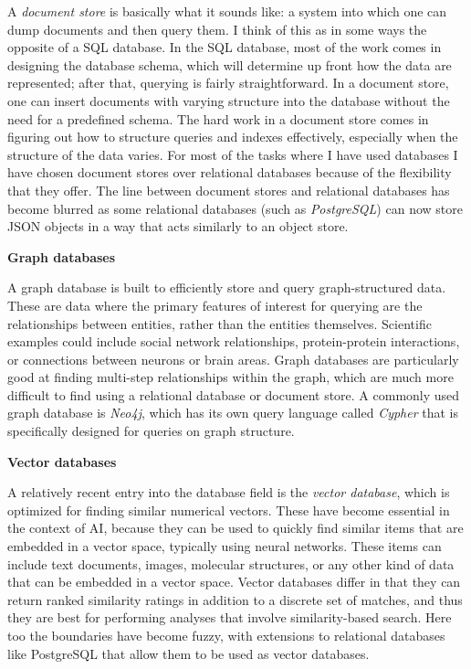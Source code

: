 A \textit{document store} is basically what it sounds like: a system into which one can dump documents and then query them. I think of this as in some ways the opposite of a SQL database.  In the SQL database, most of the work comes in designing the database schema, which will determine up front how the data are represented; after that, querying is fairly straightforward.  In a document store, one can insert documents with varying structure into the database without the need for a predefined schema. The hard work in a document store comes in figuring out how to structure queries and indexes effectively, especially when the structure of the data varies.  For most of the tasks where I have used databases I have chosen document stores over relational databases because of the flexibility that they offer. The line between document stores and relational databases has become blurred as some relational databases (such as \textit{PostgreSQL}) can now store JSON objects in a way that acts similarly to an object store.

\textbf{Graph databases}

A graph database is built to efficiently store and query graph-structured data.  These are data where the primary features of interest for querying are the relationships between entities, rather than the entities themselves. Scientific examples could include social network relationships, protein-protein interactions, or connections between neurons or brain areas.  Graph databases are particularly good at finding multi-step relationships within the graph, which are much more difficult to find using a relational database or document store.  A commonly used graph database is \textit{Neo4j}, which has its own query language called \textit{Cypher} that is specifically designed for queries on graph structure.

\textbf{Vector databases}

A relatively recent entry into the database field is the \textit{vector database}, which is optimized for finding similar numerical vectors.  These have become essential in the context of AI, because they can be used to quickly find similar items that are embedded in a vector space, typically using neural networks.  These items can include text documents, images, molecular structures, or any other kind of data that can be embedded in a vector space.  Vector databases differ in that they can return ranked similarity ratings in addition to a discrete set of matches, and thus they are best for performing analyses that involve similarity-based search.  Here too the boundaries have become fuzzy, with extensions to relational databases like PostgreSQL that allow them to be used as vector databases.

